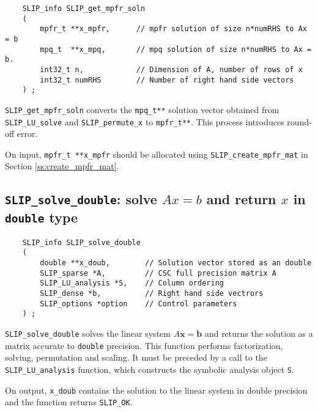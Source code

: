 \documentclass[12pt]{article}
\theoremstyle{definition}
\begin{document}
\begin{mdframed}[userdefinedwidth=6in]
{\footnotesize
\begin{verbatim}
    SLIP_info SLIP_get_mpfr_soln
    (
        mpfr_t **x_mpfr,      // mpfr solution of size n*numRHS to Ax = b
        mpq_t  **x_mpq,       // mpq solution of size n*numRHS to Ax = b.
        int32_t n,            // Dimension of A, number of rows of x
        int32_t numRHS        // Number of right hand side vectors
    ) ;
\end{verbatim}
} \end{mdframed}

\verb|SLIP_get_mpfr_soln| converts the \verb|mpq_t**| solution vector obtained
from \verb|SLIP_LU_solve| and \verb|SLIP_permute_x| to \verb|mpfr_t**|. This
process introduces round-off error.

On input, \verb|mpfr_t **x_mpfr| should be allocated using
\verb|SLIP_create_mpfr_mat| in Section \ref{ss:create_mpfr_mat}.

\cprotect\subsection{\verb|SLIP_solve_double|: solve $Ax=b$ and return $x$ in \verb|double| type}
\label{ss:SLIP_solve_double}

\begin{mdframed}[userdefinedwidth=6in]
{\footnotesize
\begin{verbatim}
    SLIP_info SLIP_solve_double
    (
        double **x_doub,        // Solution vector stored as an double
        SLIP_sparse *A,         // CSC full precision matrix A
        SLIP_LU_analysis *S,    // Column ordering
        SLIP_dense *b,          // Right hand side vectrors
        SLIP_options *option    // Control parameters
    ) ;
\end{verbatim}
} \end{mdframed}

\verb|SLIP_solve_double| solves the linear system $A\mathbf{x}=\mathbf{b}$ and
returns the solution as a matrix accurate to \verb|double| precision. This
function performs factorization, solving, permutation and scaling.  It must be
preceded by a call to the \verb|SLIP_LU_analysis| function, which constructs the
symbolic analysis object \verb|S|.

On output, \verb|x_doub| contains the solution to the linear system in
double precision and the function returns \verb|SLIP_OK|.
\end{document}
